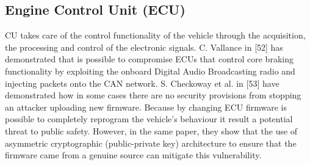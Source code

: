     \subsection{Engine Control Unit (ECU)}
    CU takes care of the control functionality of the vehicle through the acquisition, the processing and control of the electronic signals.
    C. Vallance in [52] has demonstrated that is possible to compromise ECUs that control core braking functionality by exploiting the onboard Digital Audio Broadcasting radio and injecting packets onto the CAN network. 
    \newline
    S. Checkoway et al. in [53] have  demonstrated how in some cases there are no security provisions from stopping an attacker uploading new firmware. Because by changing ECU firmware is possible to completely reprogram the vehicle’s behaviour it result a potential threat to public safety. However, in the same paper, they show that  the use of asymmetric cryptographic (public-private key) architecture to ensure that the firmware came from a genuine source can mitigate this vulnerability.

